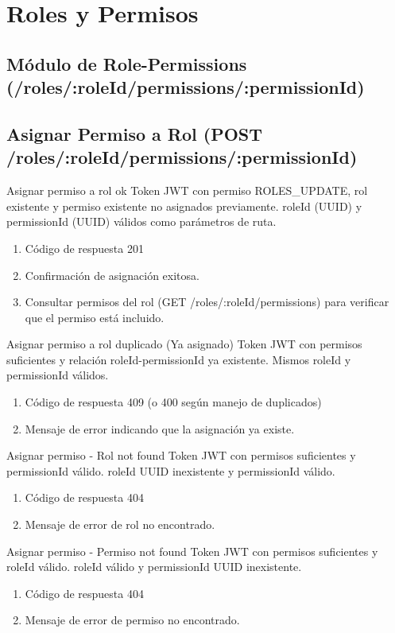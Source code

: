 \section{Roles y Permisos}
\subsection{Módulo de Role-Permissions (/roles/:roleId/permissions/:permissionId)}

\subsection{Asignar Permiso a Rol (POST /roles/:roleId/permissions/:permissionId)}

{Asignar permiso a rol ok}
{Token JWT con permiso ROLES\_UPDATE, rol existente y permiso existente no asignados previamente.}
{roleId (UUID) y permissionId (UUID) válidos como parámetros de ruta.}
{\begin{enumerate} [leftmargin=*, nosep]
    \item Código de respuesta 201
    \item Confirmación de asignación exitosa.
    \item Consultar permisos del rol (GET /roles/:roleId/permissions) para verificar que el permiso está incluido.
\end{enumerate}}

{Asignar permiso a rol duplicado (Ya asignado)}
{Token JWT con permisos suficientes y relación roleId-permissionId ya existente.}
{Mismos roleId y permissionId válidos.}
{\begin{enumerate} [leftmargin=*, nosep]
    \item Código de respuesta 409 (o 400 según manejo de duplicados)
    \item Mensaje de error indicando que la asignación ya existe.
\end{enumerate}}

{Asignar permiso - Rol not found}
{Token JWT con permisos suficientes y permissionId válido.}
{roleId UUID inexistente y permissionId válido.}
{\begin{enumerate} [leftmargin=*, nosep]
    \item Código de respuesta 404
    \item Mensaje de error de rol no encontrado.
\end{enumerate}}

{Asignar permiso - Permiso not found}
{Token JWT con permisos suficientes y roleId válido.}
{roleId válido y permissionId UUID inexistente.}
{\begin{enumerate} [leftmargin=*, nosep]
    \item Código de respuesta 404
    \item Mensaje de error de permiso no encontrado.
\end{enumerate}}

